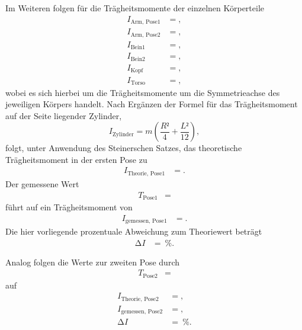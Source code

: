 Im Weiteren folgen für die Trägheitsmomente der einzelnen Körperteile
\begin{align*}
  I_{\text{Arm, Pose1}}  &= , \\
  I_{\text{Arm, Pose2}}  &= , \\
  I_{\text{Bein1}}  &= , \\
  I_{\text{Bein2}}  &= , \\
  I_{\text{Kopf}}  &= , \\
  I_{\text{Torso}}  &= ,
\end{align*}
wobei es sich hierbei um die Trägheitsmomente um die Symmetrieachse des jeweiligen Körpers handelt.
Nach Ergänzen der Formel für das Trägheitsmoment auf der Seite liegender Zylinder,
\begin{equation}
  I_{\text{Zylinder}} = m \left( \frac{R²}{4} + \frac{L²}{12} \right),
\end{equation}
folgt, unter Anwendung des Steinerschen Satzes, das theoretische Trägheitsmoment in der ersten Pose zu
\begin{align*}
  I_{\text{Theorie, Pose1}}  &= .
\end{align*}
Der gemessene Wert
\begin{align*}
  T_{\text{Pose1}}  &= 
\end{align*}
führt auf ein Trägheitsmoment von
\begin{align*}
  I_{\text{gemessen, Pose1}}  &= .
\end{align*}
Die hier vorliegende prozentuale Abweichung zum Theoriewert beträgt
\begin{align*}
  \increment I  &= \:\si{\percent}.
\end{align*}

Analog folgen die Werte zur zweiten Pose durch
\begin{align*}
  T_{\text{Pose2}}  &= 
\end{align*}
auf
\begin{align*}
  I_{\text{Theorie, Pose2}}   &= , \\
  I_{\text{gemessen, Pose2}}  &= , \\
  \increment I                 &= \:\si{\percent}.
\end{align*}




